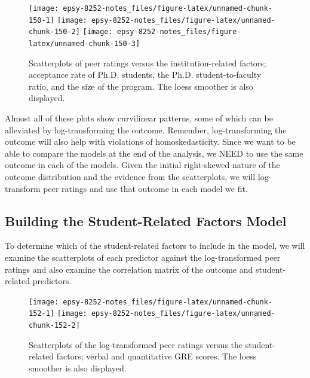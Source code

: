 \documentclass[]{book}
\newenvironment{Shaded}{\begin{snugshade}}{\end{snugshade}}
\newcommand{\CommentTok}[1]{\textcolor[rgb]{0.56,0.35,0.01}{\textit{#1}}}
\newcommand{\DataTypeTok}[1]{\textcolor[rgb]{0.13,0.29,0.53}{#1}}
\newcommand{\KeywordTok}[1]{\textcolor[rgb]{0.13,0.29,0.53}{\textbf{#1}}}
\newcommand{\NormalTok}[1]{#1}
\newcommand{\OperatorTok}[1]{\textcolor[rgb]{0.81,0.36,0.00}{\textbf{#1}}}
\newcommand{\StringTok}[1]{\textcolor[rgb]{0.31,0.60,0.02}{#1}}
\begin{document}
\begin{figure}

{\centering \texttt{[image: epsy-8252-notes\_files/figure-latex/unnamed-chunk-150-1]} \texttt{[image: epsy-8252-notes\_files/figure-latex/unnamed-chunk-150-2]} \texttt{[image: epsy-8252-notes\_files/figure-latex/unnamed-chunk-150-3]} 

}

\caption{Scatterplots of peer ratings versus the institution-related factors; acceptance rate of Ph.D. students, the Ph.D. student-to-faculty ratio, and the size of the program. The loess smoother is also displayed.}\label{fig:unnamed-chunk-150}
\end{figure}

Almost all of these plots show curvilinear patterns, some of which can be alleviated by log-transforming the outcome. Remember, log-transforming the outcome will also help with violations of homoskedasticity. Since we want to be able to compare the models at the end of the analysis, we NEED to use the same outcome in each of the models. Given the initial right-skewed nature of the outcome distribution and the evidence from the scatterplots, we will log-transform peer ratings and use that outcome in each model we fit.

\begin{Shaded}
\end{Shaded}

\hypertarget{building-the-student-related-factors-model}{%
\subsection{Building the Student-Related Factors Model}\label{building-the-student-related-factors-model}}

To determine which of the student-related factors to include in the model, we will examine the scatterplots of each predictor against the log-transformed peer ratings and also examine the correlation matrix of the outcome and student-related predictors.

\begin{figure}

{\centering \texttt{[image: epsy-8252-notes\_files/figure-latex/unnamed-chunk-152-1]} \texttt{[image: epsy-8252-notes\_files/figure-latex/unnamed-chunk-152-2]} 

}

\caption{Scatterplots of the log-transformed peer ratings versus the student-related factors; verbal and quantitative GRE scores. The loess smoother is also displayed.}\label{fig:unnamed-chunk-152}
\end{figure}
\end{document}
